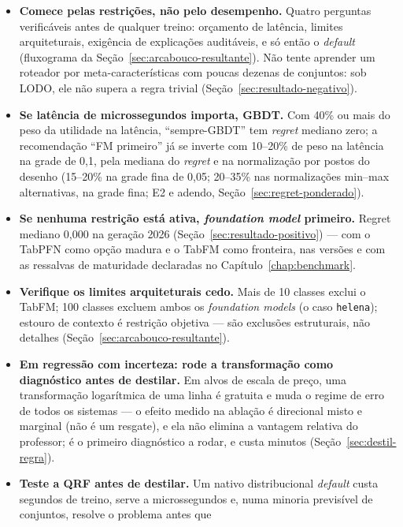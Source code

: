 \begin{itemize}
  \item \textbf{Comece pelas restrições, não pelo desempenho.} Quatro
    perguntas verificáveis antes de qualquer treino: orçamento de
    latência, limites arquiteturais, exigência de explicações
    auditáveis,
    e só então o \emph{default} (fluxograma da
    Seção~\ref{sec:arcabouco-resultante}). Não tente aprender um
    roteador por meta-características com poucas dezenas de conjuntos: sob
    LODO, ele não supera a regra trivial
    (Seção~\ref{sec:resultado-negativo}).
  \item \textbf{Se latência de microssegundos importa, GBDT.} Com 40\%
    ou mais do peso da utilidade na latência, ``sempre-GBDT'' tem \emph{regret}
    mediano zero; a recomendação ``FM primeiro'' já se inverte com
    10--20\% de peso na latência na grade de 0,1, pela mediana do
    \emph{regret} e na
    normalização por postos do desenho (15--20\% na grade fina de
    0,05; 20--35\% nas normalizações
    min--max alternativas, na grade fina; E2 e adendo,
    Seção~\ref{sec:regret-ponderado}).
  \item \textbf{Se nenhuma restrição está ativa, \emph{foundation model}
    primeiro.} Regret mediano 0,000 na geração 2026
    (Seção~\ref{sec:resultado-positivo}) --- com o TabPFN como opção
    madura e o TabFM como fronteira, nas versões e com as ressalvas de
    maturidade declaradas no Capítulo~\ref{chap:benchmark}.
  \item \textbf{Verifique os limites arquiteturais cedo.} Mais de 10
    classes exclui o TabFM; 100 classes excluem ambos os
    \emph{foundation models} (o caso \texttt{helena}); estouro de
    contexto é restrição objetiva --- são exclusões estruturais, não
    detalhes (Seção~\ref{sec:arcabouco-resultante}).
  \item \textbf{Em regressão com incerteza: rode a transformação
    como diagnóstico antes de
    destilar.} Em alvos de escala de preço, uma transformação
    logarítmica de uma linha é gratuita e muda o regime de erro de
    todos os sistemas --- o efeito medido na ablação é direcional
    misto e marginal (não é um resgate), e ela não elimina a
    vantagem relativa do
    professor; é o primeiro diagnóstico a rodar, e custa minutos
    (Seção~\ref{sec:destil-regra}).
  \item \textbf{Teste a QRF antes de destilar.} Um nativo distribucional
    \emph{default} custa segundos de treino, serve a microssegundos e,
    numa minoria previsível de conjuntos, resolve o problema antes que

\end{itemize}
